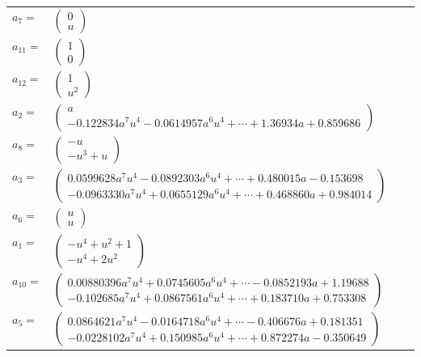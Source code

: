 \documentclass[1p]{elsarticle_modified}
\theoremstyle{definition}
\begin{document}
\begin{tabular}{m{7pt} m{180pt} m{7pt} m{180pt} }
\flushright $a_{7}=$&$\begin{pmatrix}0\\u\end{pmatrix}$ \\
\flushright $a_{11}=$&$\begin{pmatrix}1\\0\end{pmatrix}$ \\
\flushright $a_{12}=$&$\begin{pmatrix}1\\u^2\end{pmatrix}$ \\
\flushright $a_{2}=$&$\begin{pmatrix}a\\-0.122834 a^{7} u^{4}-0.0614957 a^{6} u^{4}+\cdots+1.36934 a+0.859686\end{pmatrix}$ \\
\flushright $a_{8}=$&$\begin{pmatrix}- u\\- u^3+u\end{pmatrix}$ \\
\flushright $a_{3}=$&$\begin{pmatrix}0.0599628 a^{7} u^{4}-0.0892303 a^{6} u^{4}+\cdots+0.480015 a-0.153698\\-0.0963330 a^{7} u^{4}+0.0655129 a^{6} u^{4}+\cdots+0.468860 a+0.984014\end{pmatrix}$ \\
\flushright $a_{6}=$&$\begin{pmatrix}u\\u\end{pmatrix}$ \\
\flushright $a_{1}=$&$\begin{pmatrix}- u^4+u^2+1\\- u^4+2 u^2\end{pmatrix}$ \\
\flushright $a_{10}=$&$\begin{pmatrix}0.00880396 a^{7} u^{4}+0.0745605 a^{6} u^{4}+\cdots-0.0852193 a+1.19688\\-0.102685 a^{7} u^{4}+0.0867561 a^{6} u^{4}+\cdots+0.183710 a+0.753308\end{pmatrix}$ \\
\flushright $a_{5}=$&$\begin{pmatrix}0.0864621 a^{7} u^{4}-0.0164718 a^{6} u^{4}+\cdots-0.406676 a+0.181351\\-0.0228102 a^{7} u^{4}+0.150985 a^{6} u^{4}+\cdots+0.872274 a-0.350649\end{pmatrix}$ \\

\end{tabular}
\end{document}
